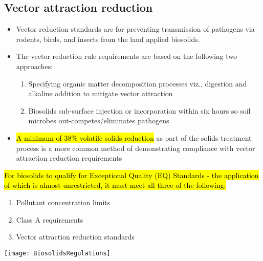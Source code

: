 \subsection{Vector attraction reduction} 
			\begin{itemize}
				\item Vector reduction standards are for preventing transmission of pathogens via rodents, birds, and insects from the land applied biosolids.
				\item The vector reduction rule requirements are based on the following two approaches: 
					\begin{enumerate}
						\item Specifying organic matter decomposition processes viz., digestion and alkaline addition to mitigate vector attraction
						\item Biosolids sub-surface injection or incorporation within six hours so soil microbes out-competes/eliminates pathogens
					\end{enumerate}
				\item \hl{A minimum of 38\% volatile solids reduction} as part of the solids treatment process is a more common method of demonstrating compliance with vector attraction reduction requirements
			\end{itemize}
		\hl{For biosolids to qualify for Exceptional Quality (EQ) Standards - the application of which is almost unrestricted, it must meet all three of the following:}
		\begin{enumerate}
			\item Pollutant concentration limits
			\item Class A requirements
			\item Vector attraction reduction standards
		\end{enumerate}
		



\begin{sidewaysfigure}[!htp]
	\begin{center}
		\texttt{[image: BiosolidsRegulations]}
	\end{center}
\end{sidewaysfigure} 


